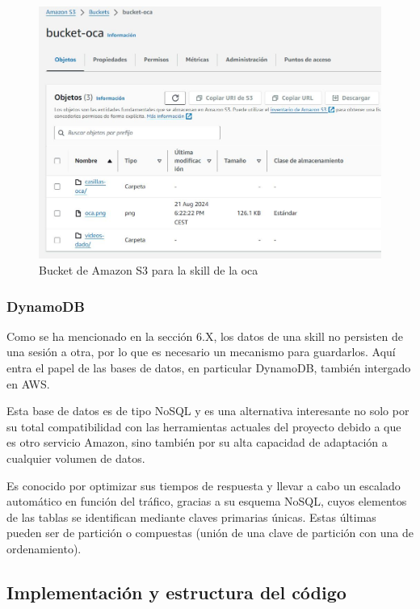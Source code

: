 \begin{figure}[H]
	\centering
	\includegraphics[width=1\textwidth]{imgs/aws-s3-1.jpg}
	\caption{Bucket de Amazon S3 para la skill de la oca}
	\label{fig:aws-s3-1}
\end{figure}

\subsubsection{DynamoDB}

Como se ha mencionado en la sección 6.X, los datos de una skill no persisten de una sesión a otra, por lo que es necesario un mecanismo para guardarlos. Aquí entra el papel de las bases de datos, en particular DynamoDB, también intergado en AWS.

Esta base de datos es de tipo NoSQL y es una alternativa interesante no solo por su total compatibilidad con las herramientas actuales del proyecto debido a que es otro servicio Amazon, sino también por su alta capacidad de adaptación a cualquier volumen de datos. 

Es conocido por optimizar sus tiempos de respuesta y llevar a cabo un escalado automático en función del tráfico, gracias a su esquema NoSQL, cuyos elementos de las tablas se identifican mediante claves primarias únicas. Estas últimas pueden ser de partición o compuestas (unión de una clave de partición con una de ordenamiento).



\subsection{Implementación y estructura del código}



